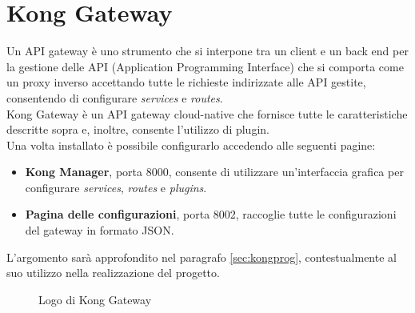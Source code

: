 \section{Kong Gateway}\label{sec:kongintro}
Un API gateway è uno strumento che si interpone tra un client e un back end per la gestione delle API (Application Programming Interface) che si comporta come un proxy inverso accettando tutte le richieste indirizzate alle API gestite, consentendo di configurare \emph{services} e \emph{routes}.\\
Kong Gateway è un API gateway cloud-native che fornisce tutte le caratteristiche descritte sopra e, inoltre, consente l’utilizzo di plugin.\\
Una volta installato è possibile configurarlo accedendo alle seguenti pagine:
\begin{itemize}
	\item \textbf{Kong Manager}, porta 8000, consente di utilizzare un’interfaccia grafica per configurare \emph{services}, \emph{routes} e \emph{plugins}.
	\item \textbf{Pagina delle configurazioni}, porta 8002, raccoglie tutte le configurazioni del gateway in formato JSON.
\end{itemize}

L'argomento sarà approfondito nel paragrafo \ref{sec:kongprog}, contestualmente al suo utilizzo nella realizzazione del progetto.

\begin{figure}[ht]
	\centering
	\caption{Logo di Kong Gateway}
	\label{fig:one}
\end{figure}

